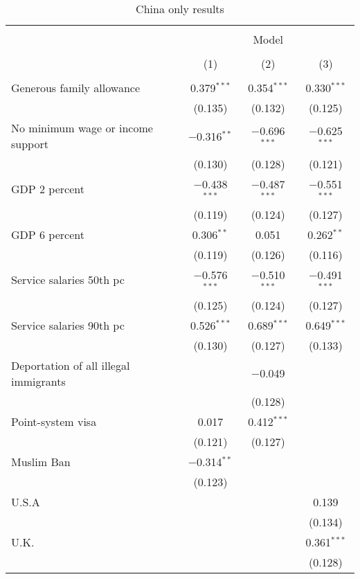 
\begin{table}[!htbp] \centering 
  \caption{China only results} 
  \label{tab:china} 
\begin{tabular}{@{\extracolsep{5pt}}lccc} 
\\[-1.8ex]\hline 
\hline \\[-1.8ex] 
 & \multicolumn{3}{c}{Model} \\ 
\cline{2-4} 
\\[-1.8ex] & (1) & (2) & (3)\\ 
\hline \\[-1.8ex] 
 Generous family allowance & 0.379$^{***}$ & 0.354$^{***}$ & 0.330$^{***}$ \\ 
  & (0.135) & (0.132) & (0.125) \\ 
  No minimum wage or income support & $-$0.316$^{**}$ & $-$0.696$^{***}$ & $-$0.625$^{***}$ \\ 
  & (0.130) & (0.128) & (0.121) \\ 
  GDP 2 percent & $-$0.438$^{***}$ & $-$0.487$^{***}$ & $-$0.551$^{***}$ \\ 
  & (0.119) & (0.124) & (0.127) \\ 
  GDP 6 percent & 0.306$^{**}$ & 0.051 & 0.262$^{**}$ \\ 
  & (0.119) & (0.126) & (0.116) \\ 
  Service salaries 50th pc & $-$0.576$^{***}$ & $-$0.510$^{***}$ & $-$0.491$^{***}$ \\ 
  & (0.125) & (0.124) & (0.127) \\ 
  Service salaries 90th pc & 0.526$^{***}$ & 0.689$^{***}$ & 0.649$^{***}$ \\ 
  & (0.130) & (0.127) & (0.133) \\ 
  Deportation of all illegal immigrants &  & $-$0.049 &  \\ 
  &  & (0.128) &  \\ 
  Point-system visa & 0.017 & 0.412$^{***}$ &  \\ 
  & (0.121) & (0.127) &  \\ 
  Muslim Ban & $-$0.314$^{**}$ &  &  \\ 
  & (0.123) &  &  \\ 
  U.S.A &  &  & 0.139 \\ 
  &  &  & (0.134) \\ 
  U.K. &  &  & 0.361$^{***}$ \\ 
  &  &  & (0.128) \\ 

\end{tabular}
\end{table}
